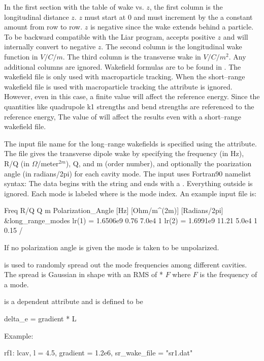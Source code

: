 {{In the first section with the table of wake vs. $z$, the first column
is the longitudinal distance $z$. $z$ must start at 0 and must
increment by the a constant amount from row to row. $z$ is negative
since the wake extends behind a particle. To be backward compatible
with the Liar program, \bmad accepts positive $z$ and will internally
convert to negative $z$. The second column is the longitudinal wake
function in $V/C/m$. The third column is the transverse wake in
$V/C/m^2$. Any additional columns are ignored.  Wakefield formulas are
to be found in .  The wakefield file is only used
with macroparticle tracking.  When the short--range wakefield file is
used with macroparticle tracking the  attribute is
ignored. However, even in this case, a finite  value will
affect the reference energy. Since the quantities like quadrupole k1
strengths and bend strengths are referenced to the reference energy,
The value of  will affect the results even with a
short--range wakefield file.

The input file name for the long--range wakefields is specified using
the  attribute. The file gives the transverse dipole
wake by specifying the frequency (in Hz), R/Q (in
$\Omega$/meter$^{2m}$), Q, and m (order number), and optionally the
poarization angle (in radians/2pi) for each cavity mode. The input
uses Fortran90 namelist syntax: The data begins with the string
 and ends with a \vn{/}. Everything outside is
ignored. Each mode is labeled  where  is the mode
index. An example input file is:
\begin{example}
              Freq       R/Q      Q       m  Polarization_Angle
              [Hz]  [Ohm/m^(2m)]             [Radians/2pi]
  &long_range_modes
    lr(1) = 1.6506e9    0.76    7.0e4     1
    lr(2) = 1.6991e9   11.21    5.0e4     1     0.15
  /
\end{example}
If no polarization angle is given the mode is taken to be unpolarized.

 is used to randomly spread out the mode frequencies
among different cavities. The spread is Gaussian in shape with an RMS
of  * $F$ where $F$ is the frequency of a mode.

 is a dependent attribute and is
defined to be
\begin{example}
  delta_e = gradient * L
\end{example}

Example:
\begin{example}
  rf1: lcav, l = 4.5, gradient = 1.2e6, sr\_wake\_file = "sr1.dat"
\end{example}

}}
